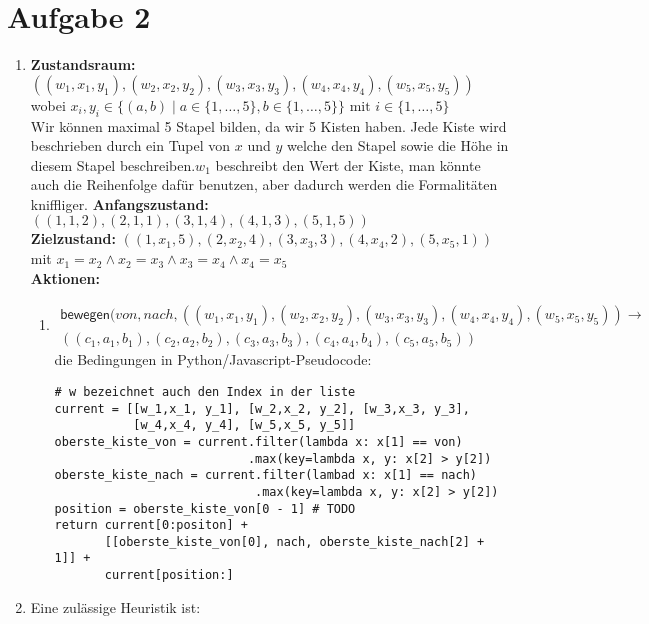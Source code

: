 \documentclass[a4paper,10pt]{article}
\begin{document}
\section*{Aufgabe 2}
\begin{enumerate}[~~a)]
    \item 
    \textbf{Zustandsraum:} 
    $((w_1, x_1, y_1), (w_2, x_2, y_2), (w_3, x_3, y_3), (w_4, x_4, y_4), (w_5, x_5, y_5))$ wobei $ x_i, y_i \in \{ (a, b) \mid a \in \{1,\dots,5\}, b \in \{1,\dots,5\}\} \text{ mit }i \in \{1,\dots,5\}$ \\
    Wir können maximal 5 Stapel bilden, da wir 5 Kisten haben. Jede Kiste wird beschrieben durch ein Tupel von $x$ und $y$ welche den Stapel sowie die Höhe in diesem Stapel beschreiben.$w_1$ beschreibt den Wert der Kiste, man könnte auch die Reihenfolge dafür benutzen, aber dadurch werden die Formalitäten kniffliger.
    \textbf{Anfangszustand:}
    $((1,1,2),(2,1,1),(3,1,4),(4,1,3),(5,1,5))$ \\
    \textbf{Zielzustand:}
    $((1,x_1,5),(2,x_2,4),(3,x_3,3),(4,x_4,2),(5,x_5,1))$ mit $x_1 = x_2 \land x_2 = x_3 \land x_3 = x_4 \land x_4 = x_5$\\
    \textbf{Aktionen:}
    \begin{enumerate}[~~1.]
    \item \begin{align*}\textsf{bewegen}(von, nach, ((w_1,x_1, y_1), (w_2,x_2, y_2), (w_3,x_3, y_3), (w_4,x_4, y_4), (w_5,x_5, y_5)) \rightarrow  \\ ((c_1, a_1, b_1), (c_2, a_2, b_2), (c_3, a_3, b_3), (c_4, a_4, b_4), (c_5, a_5, b_5))\end{align*} 
    die Bedingungen in Python/Javascript-Pseudocode:
\begin{lstlisting}
# w bezeichnet auch den Index in der liste
current = [[w_1,x_1, y_1], [w_2,x_2, y_2], [w_3,x_3, y_3],
           [w_4,x_4, y_4], [w_5,x_5, y_5]]
oberste_kiste_von = current.filter(lambda x: x[1] == von)
                           .max(key=lambda x, y: x[2] > y[2])
oberste_kiste_nach = current.filter(lambad x: x[1] == nach)
                            .max(key=lambda x, y: x[2] > y[2])
position = oberste_kiste_von[0 - 1] # TODO
return current[0:positon] +
       [[oberste_kiste_von[0], nach, oberste_kiste_nach[2] + 1]] +
       current[position:]

\end{lstlisting}
    \end{enumerate}
    \item Eine zulässige Heuristik ist: \\
\end{enumerate}
\end{document}
